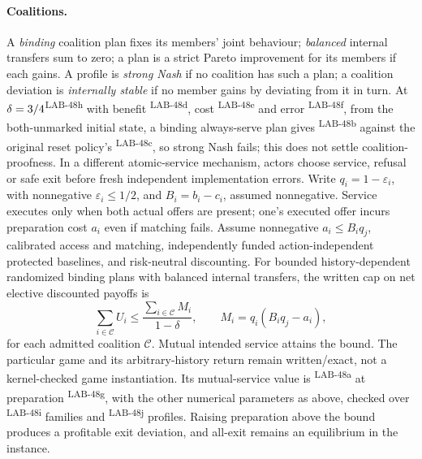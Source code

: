 \documentclass[pdflatex,sn-basic]{sn-jnl}%
\newcommand{\rec}[1]{\ifannotated\textsuperscript{\textcolor{blue!60!black}{\tiny#1}}\fi}
\begin{document}
\begin{appendices}
\paragraph{Coalitions.} A \emph{binding} coalition plan fixes its members' joint behaviour; \emph{balanced} internal transfers sum to zero; a plan is a strict Pareto improvement for its members if each gains. A profile is \emph{strong Nash} if no coalition has such a plan; a coalition deviation is \emph{internally stable} if no member gains by deviating from it in turn. At $\delta=3/4$\rec{LAB-48h} with benefit \numDFifteenBenefit\rec{LAB-48d}, cost \numDFifteenCost\rec{LAB-48e} and error \numDFifteenEps\rec{LAB-48f}, from the both-unmarked initial state, a binding always-serve plan gives \numDFifteenBindingValue\rec{LAB-48b} against the original reset policy's \numDFifteenResetValue\rec{LAB-48c}, so strong Nash fails; this does not settle coalition-proofness. In a different atomic-service mechanism, actors choose service, refusal or safe exit before fresh independent implementation errors. Write $q_i=1-\varepsilon_i$, with nonnegative $\varepsilon_i\le1/2$, and $B_i=b_i-c_i$, assumed nonnegative. Service executes only when both actual offers are present; one's executed offer incurs preparation cost $a_i$ even if matching fails. Assume nonnegative $a_i\le B_iq_j$, calibrated access and matching, independently funded action-independent protected baselines, and risk-neutral discounting. For bounded history-dependent randomized binding plans with balanced internal transfers, the written cap on net elective discounted payoffs is
\[
 \sum_{i\in\mathcal C}U_i\le\frac{\sum_{i\in\mathcal C}M_i}{1-\delta},\qquad M_i=q_i(B_iq_j-a_i),
\]
for each admitted coalition $\mathcal C$. Mutual intended service attains the bound. The particular game and its arbitrary-history return remain written/exact, not a kernel-checked game instantiation. Its mutual-service value is \numDFifteenCCValue\rec{LAB-48a} at preparation \numDFifteenPrep\rec{LAB-48g}, with the other numerical parameters as above, checked over \numDFifteenFamilies\rec{LAB-48i} families and \numDFifteenProfiles\rec{LAB-48j} profiles. Raising preparation above the bound produces a profitable exit deviation, and all-exit remains an equilibrium in the instance.


\end{appendices}
\end{document}
